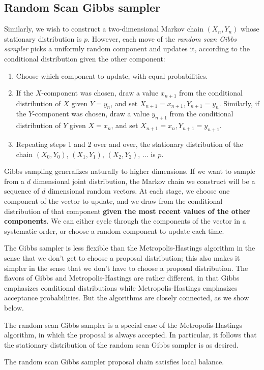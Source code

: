 \documentclass[11pt]{elegantbook}
\begin{document}
\subsection{ Random Scan Gibbs sampler}
Similarly, we wish to construct a two-dimensional Markov chain $(X_n,Y_n)$ whose stationary distribution is $p$. However, each move of the \textit{random scan Gibbs sampler} picks a uniformly random component and updates it, according to the conditional distribution given the other component:
\begin{enumerate}
    \item Choose which component to update, with equal probabilities.
    \item If the $X$-component was chosen, draw a value $x_{n+1}$ from the conditional distribution of $X$ given $Y=y_n$, and set $X_{n+1}=x_{n+1}, Y_{n+1}=y_n$. Similarly, if the $Y$-component was chosen, draw a value $y_{n+1}$ from the conditional distribution of $Y$ given $X=x_n$, and set $X_{n+1}=x_n, Y_{n+1}=y_{n+1}$.
    \item Repeating steps 1 and 2 over and over, the stationary distribution of the chain $\left(X_0, Y_0\right)$, $\left(X_1, Y_1\right)$, $\left(X_2, Y_2\right)$, $\ldots$ is $p$.
\end{enumerate}
Gibbs sampling generalizes naturally to higher dimensions. If we want to sample from a $d$ dimensional joint distribution, the Markov chain we construct will be a sequence of $d$ dimensional random vectors. At each stage, we choose one component of the vector to update, and we draw from the conditional distribution of that component \textbf{given the most recent values of the other components}. We can either cycle through the components of the vector in a systematic order, or choose a random component to update each time.

The Gibbs sampler is less flexible than the Metropolis-Hastings algorithm in the sense that we don't get to choose a proposal distribution; this also makes it simpler in the sense that we don't have to choose a proposal distribution. The flavors of Gibbs and Metropolis-Hastings are rather different, in that Gibbs emphasizes conditional distributions while Metropolis-Hastings emphasizes acceptance probabilities. But the algorithms are closely connected, as we show below.

\begin{theorem}
    The random scan Gibbs sampler is a special case of the Metropolis-Hastings algorithm, in which the proposal is always accepted. In particular, it follows that the stationary distribution of the random scan Gibbs sampler is as desired.
\end{theorem}
The random scan Gibbs sampler proposal chain satisfies local balance.
\end{document}
